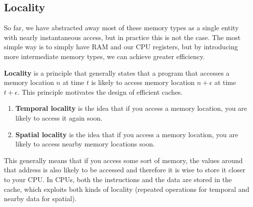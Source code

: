 \subsection{Locality}

  So far, we have abstracted away most of these memory types as a single entity with nearly instantaneous access, but in practice this is not the case. The most simple way is to simply have RAM and our CPU registers, but by introducing more intermediate memory types, we can achieve greater efficiency. 

  \begin{definition}[Locality]
    \textbf{Locality} is a principle that generally states that a program that accesses a memory location $n$ at time $t$ is likely to access memory location $n + \epsilon$ at time $t + \epsilon$. This principle motivates the design of efficient caches. 
    \begin{enumerate}
      \item \textbf{Temporal locality} is the idea that if you access a memory location, you are likely to access it again soon. 
      \item \textbf{Spatial locality} is the idea that if you access a memory location, you are likely to access nearby memory locations soon.
    \end{enumerate}
    This generally means that if you access some sort of memory, the values around that address is also likely to be accessed and therefore it is wise to store it closer to your CPU. In CPUs, both the instructions and the data are stored in the cache, which exploits both kinds of locality (repeated operations for temporal and nearby data for spatial). 
  \end{definition}

